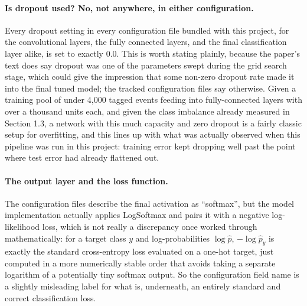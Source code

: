\documentclass[11pt]{article}
\begin{document}
\paragraph{Is dropout used? No, not anywhere, in either configuration.} Every dropout setting in every configuration file bundled with this project, for the convolutional layers, the fully connected layers, and the final classification layer alike, is set to exactly 0.0. This is worth stating plainly, because the paper's text does say dropout was one of the parameters swept during the grid search stage, which could give the impression that some non-zero dropout rate made it into the final tuned model; the tracked configuration files say otherwise. Given a training pool of under 4,000 tagged events feeding into fully-connected layers with over a thousand units each, and given the class imbalance already measured in Section 1.3, a network with this much capacity and zero dropout is a fairly classic setup for overfitting, and this lines up with what was actually observed when this pipeline was run in this project: training error kept dropping well past the point where test error had already flattened out.

\paragraph{The output layer and the loss function.} The configuration files describe the final activation as ``softmax'', but the model implementation actually applies LogSoftmax and pairs it with a negative log-likelihood loss, which is not really a discrepancy once worked through mathematically: for a target class $y$ and log-probabilities $\log \hat p$, $-\log \hat p_y$ is exactly the standard cross-entropy loss evaluated on a one-hot target, just computed in a more numerically stable order that avoids taking a separate logarithm of a potentially tiny softmax output. So the configuration field name is a slightly misleading label for what is, underneath, an entirely standard and correct classification loss.
\end{document}
